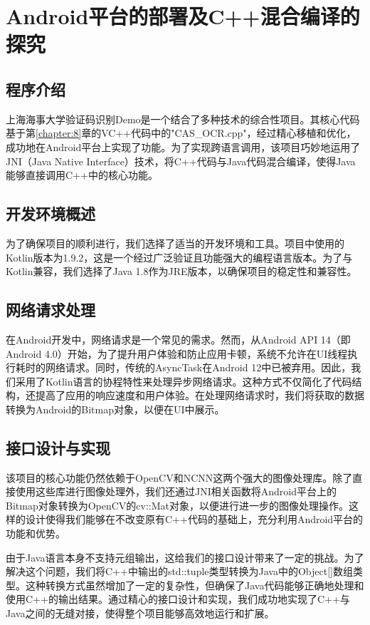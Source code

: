 \newpage
\chapter{Android平台的部署及C++混合编译的探究}
\label{chapter:10}

\section{程序介绍}

上海海事大学验证码识别Demo是一个结合了多种技术的综合性项目。其核心代码基于第\ref{chapter:8}章的VC++代码中的"CAS\_OCR.cpp"，经过精心移植和优化，成功地在Android平台上实现了功能。为了实现跨语言调用，该项目巧妙地运用了JNI（Java Native Interface）技术，将C++代码与Java代码混合编译，使得Java能够直接调用C++中的核心功能。

\section{开发环境概述}

为了确保项目的顺利进行，我们选择了适当的开发环境和工具。项目中使用的Kotlin版本为1.9.2，这是一个经过广泛验证且功能强大的编程语言版本。为了与Kotlin兼容，我们选择了Java 1.8作为JRE版本，以确保项目的稳定性和兼容性。

\section{网络请求处理}

在Android开发中，网络请求是一个常见的需求。然而，从Android API 14（即Android 4.0）开始，为了提升用户体验和防止应用卡顿，系统不允许在UI线程执行耗时的网络请求。同时，传统的AsyncTask在Android 12中已被弃用。因此，我们采用了Kotlin语言的协程特性来处理异步网络请求。这种方式不仅简化了代码结构，还提高了应用的响应速度和用户体验。在处理网络请求时，我们将获取的数据转换为Android的Bitmap对象，以便在UI中展示。

\section{接口设计与实现}

该项目的核心功能仍然依赖于OpenCV和NCNN这两个强大的图像处理库。除了直接使用这些库进行图像处理外，我们还通过JNI相关函数将Android平台上的Bitmap对象转换为OpenCV的cv::Mat对象，以便进行进一步的图像处理操作。这样的设计使得我们能够在不改变原有C++代码的基础上，充分利用Android平台的功能和优势。

由于Java语言本身不支持元组输出，这给我们的接口设计带来了一定的挑战。为了解决这个问题，我们将C++中输出的std::tuple类型转换为Java中的Object[]数组类型。这种转换方式虽然增加了一定的复杂性，但确保了Java代码能够正确地处理和使用C++的输出结果。通过精心的接口设计和实现，我们成功地实现了C++与Java之间的无缝对接，使得整个项目能够高效地运行和扩展。

